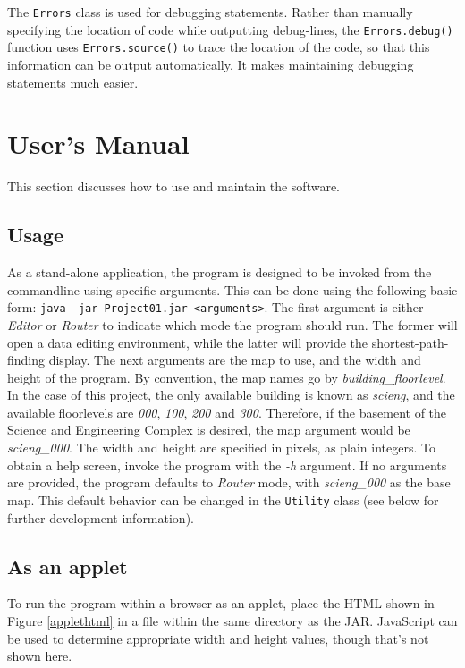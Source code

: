 \documentclass[12pt,letterpaper,titlepage]{article}   %
\begin{document}
The \texttt{Errors} class is used for debugging statements. Rather than manually
specifying the location of code while outputting debug-lines, the
\texttt{Errors.debug()} function uses \texttt{Errors.source()} to trace
the location of
the code, so that this information can be output automatically. It makes
maintaining debugging statements much easier.


\section{User's Manual}

This section discusses how to use and maintain the software.

\subsection{Usage}
As a stand-alone application, the program is designed to be invoked from
the commandline using specific arguments. This can be done using the
following basic form: \texttt{java -jar Project01.jar <arguments>}. The first
argument is either \emph{Editor} or \emph{Router} to indicate
which mode the program should run. The former will open a data editing
environment, while the latter will provide the shortest-path-finding
display. The next arguments are the map to use, and the width and height
of the program. By convention, the map names go by
\emph{building\_floorlevel}. In the case of this project, the only
available building is known as \emph{scieng}, and the available floorlevels
are \emph{000}, \emph{100}, \emph{200} and \emph{300}. Therefore, if the
basement of the Science and
Engineering Complex is desired, the map argument would be
\emph{scieng\_000}. The width and height are specified in
pixels, as plain integers. To obtain a help screen, invoke the program
with the \emph{-h} argument. If no arguments are provided, the program
defaults to \emph{Router} mode, with \emph{scieng\_000} as the base map. 
This default behavior can be changed in the \texttt{Utility} class (see
below for further development information).

\subsection{As an applet}
To run the program within a browser as an applet, place the HTML shown
in Figure \ref{applethtml} in a file within the same directory as the
JAR. JavaScript can be used to determine appropriate width and height
values, though that's not shown here.
\end{document}
